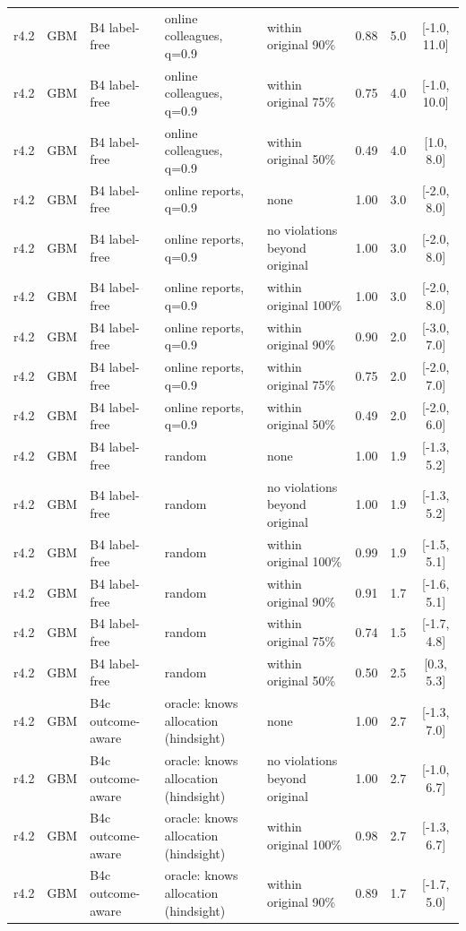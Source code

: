 \documentclass[10pt,onecolumn,letterpaper]{article}
\begin{document}
\begin{longtable}{lllp{4.2cm}p{3.4cm}ccc}
r4.2 & GBM & B4 label-free & online colleagues, q=0.9 & within original 90\% & 0.88 & 5.0 & [-1.0, 11.0] \\
r4.2 & GBM & B4 label-free & online colleagues, q=0.9 & within original 75\% & 0.75 & 4.0 & [-1.0, 10.0] \\
r4.2 & GBM & B4 label-free & online colleagues, q=0.9 & within original 50\% & 0.49 & 4.0 & [1.0, 8.0] \\
r4.2 & GBM & B4 label-free & online reports, q=0.9 & none & 1.00 & 3.0 & [-2.0, 8.0] \\
r4.2 & GBM & B4 label-free & online reports, q=0.9 & no violations beyond original & 1.00 & 3.0 & [-2.0, 8.0] \\
r4.2 & GBM & B4 label-free & online reports, q=0.9 & within original 100\% & 1.00 & 3.0 & [-2.0, 8.0] \\
r4.2 & GBM & B4 label-free & online reports, q=0.9 & within original 90\% & 0.90 & 2.0 & [-3.0, 7.0] \\
r4.2 & GBM & B4 label-free & online reports, q=0.9 & within original 75\% & 0.75 & 2.0 & [-2.0, 7.0] \\
r4.2 & GBM & B4 label-free & online reports, q=0.9 & within original 50\% & 0.49 & 2.0 & [-2.0, 6.0] \\
r4.2 & GBM & B4 label-free & random & none & 1.00 & 1.9 & [-1.3, 5.2] \\
r4.2 & GBM & B4 label-free & random & no violations beyond original & 1.00 & 1.9 & [-1.3, 5.2] \\
r4.2 & GBM & B4 label-free & random & within original 100\% & 0.99 & 1.9 & [-1.5, 5.1] \\
r4.2 & GBM & B4 label-free & random & within original 90\% & 0.91 & 1.7 & [-1.6, 5.1] \\
r4.2 & GBM & B4 label-free & random & within original 75\% & 0.74 & 1.5 & [-1.7, 4.8] \\
r4.2 & GBM & B4 label-free & random & within original 50\% & 0.50 & 2.5 & [0.3, 5.3] \\
r4.2 & GBM & B4c outcome-aware & oracle: knows allocation (hindsight) & none & 1.00 & 2.7 & [-1.3, 7.0] \\
r4.2 & GBM & B4c outcome-aware & oracle: knows allocation (hindsight) & no violations beyond original & 1.00 & 2.7 & [-1.0, 6.7] \\
r4.2 & GBM & B4c outcome-aware & oracle: knows allocation (hindsight) & within original 100\% & 0.98 & 2.7 & [-1.3, 6.7] \\
r4.2 & GBM & B4c outcome-aware & oracle: knows allocation (hindsight) & within original 90\% & 0.89 & 1.7 & [-1.7, 5.0] \\

\end{longtable}
\end{document}
